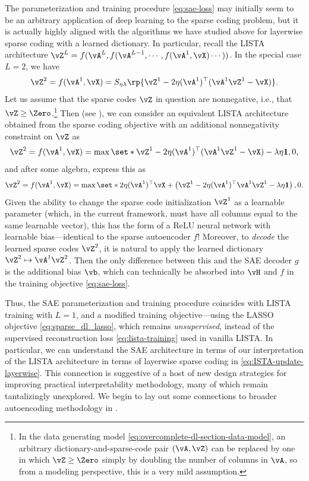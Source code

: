 \documentclass[../../book-main.tex]{subfiles}
\begin{document}
The parameterization and training procedure \eqref{eq:sae-loss} may initially
seem to be an arbitrary application of deep learning to the sparse coding
problem, but it is actually highly aligned with the algorithms we have studied
above for layerwise sparse coding with a learned dictionary.
In particular, recall the LISTA %
architecture $\vZ^{L} = f(\vA^L, f(\vA^{L-1}, \cdots, f(\vA^1, \vX) \cdots ))$.
In the special case $L=2$, we have
\begin{equation}
    \vZ^2 = f(\vA^1, \vX)
    =S_{\eta\lambda}\rp{\vZ^{1} - 2\eta(\vA^{1})^{\top}(\vA^1\vZ^{1} - \vX)}.
\end{equation}
Let us assume that the sparse codes $\vZ$ in question are nonnegative, i.e.,
that $\vZ \geq \Zero$.\footnote{In the data generating model
    \eqref{eq:overcomplete-dl-section-data-model}, an arbitrary
    dictionary-and-sparse-code pair $(\vA, \vZ)$ can be replaced by one in which
    $\vZ \geq \Zero$ simply by doubling the number of columns in $\vA$, so from
a modeling perspective, this is a very mild assumption.}
Then (see ), we can consider an equivalent
LISTA architecture obtained from the sparse coding objective with an additional
nonnegativity constraint on $\vZ$ as
\begin{equation}
    \vZ^2 = f(\vA^1, \vX)
    =\max \set*{\vZ^{1} - 2\eta(\vA^{1})^{\top}(\vA^1\vZ^{1} - \vX)
    - \lambda\eta \mathbf{1}, 0},
\end{equation}
and after some algebra, express this as
\begin{equation}
    \vZ^2 = f(\vA^1, \vX)
    =\max \set*{
        2\eta(\vA^{1})^{\top}\vX
        +
        \left(
            \vZ^{1} - 2\eta(\vA^{1})^{\top}\vA^1\vZ^{1} - \lambda\eta \mathbf{1}
        \right), 0
    }.
\end{equation}
Given the ability to change the sparse code initialization $\vZ^1$ as
a learnable parameter (which, in the current framework, must have all columns
equal to the same learnable vector), this has the form of a ReLU neural network
with learnable bias---identical to the sparse autoencoder $f$!
Moreover, to \textit{decode} the learned sparse codes $\vZ^2$, it is natural to
apply the learned dictionary $\vZ^2 \mapsto \vA^1 \vZ^2$. Then the only
difference between this and the SAE decoder $g$ is the additional bias $\vb$,
which can technically be absorbed into $\vH$ and $f$ in the training objective
\eqref{eq:sae-loss}.

Thus, the SAE parameterization and training procedure coincides with
LISTA training with $L=1$, and a modified training objective---using the
LASSO objective \eqref{eq:sparse_dl_lasso}, which remains {\em
unsupervised}, instead
of the supervised reconstruction loss \eqref{eq:lista-training} used in vanilla
LISTA. In particular, we can understand the SAE architecture in terms of our
interpretation of the LISTA architecture in terms of layerwise sparse coding in
\eqref{eq:ISTA-update-layerwise}. This connection is suggestive of a host of new
design strategies for improving practical interpretability methodology, many of
which remain tantalizingly unexplored. We begin to lay out some connections to
broader autoencoding methodology in .
\end{document}
